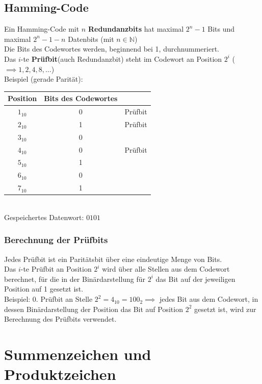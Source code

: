 \documentclass[12pt]{article}
\begin{document}
\subsection{Hamming-Code}
Ein Hamming-Code mit $n$ \textbf{Redundanzbits} hat maximal $2^n - 1$ Bits und maximal $2^n -1 - n$ Datenbits (mit $n \in \mathbb{N}$)\\
Die Bits des Codewortes werden, beginnend bei 1, durchnummeriert. \\
Das $i$-te \textbf{Prüfbit}(auch Redundanzbit) steht im Codewort an Position $2^i$ ($\implies 1,2,4,8,\dots$) \\
Beispiel (gerade Parität): \begin{tabular}{c|c c}
    Position & Bits des Codewortes & \\ \hline
    \cellcolor{lightgray}$1_{10}$ & \cellcolor{lightgray}0 & Prüfbit \\
    \cellcolor{lightgray}$2_{10}$ & \cellcolor{lightgray}1 & Prüfbit \\
    $3_{10}$ & 0 & \\
    \cellcolor{lightgray}$4_{10}$ & \cellcolor{lightgray}0 & Prüfbit \\
    $5_{10}$ & 1 & \\
    $6_{10}$ & 0 & \\
    $7_{10}$ & 1 & \\
\end{tabular} \\ Gespeichertes Datenwort: $0101$ \\
\subsubsection{Berechnung der Prüfbits}
Jedes Prüfbit ist ein Paritätsbit über eine eindeutige Menge von Bits. \\
Das $i$-te Prüfbit an Position $2^i$ wird über alle Stellen aus dem Codewort berechnet, für die in der Binärdarstellung für $2^i$ das Bit auf der jeweiligen Position auf 1 gesetzt ist. \\
Beispiel: 0. Prüfbit an Stelle $2^2 = 4_{10} = 100_2 \implies$ jedes Bit aus dem Codewort, in dessen Binärdarstellung der Position das Bit auf Position $2^2$ gesetzt ist, wird zur Berechnung des Prüfbits verwendet. \\ 

\newpage
\section{Summenzeichen und Produktzeichen}
\end{document}

